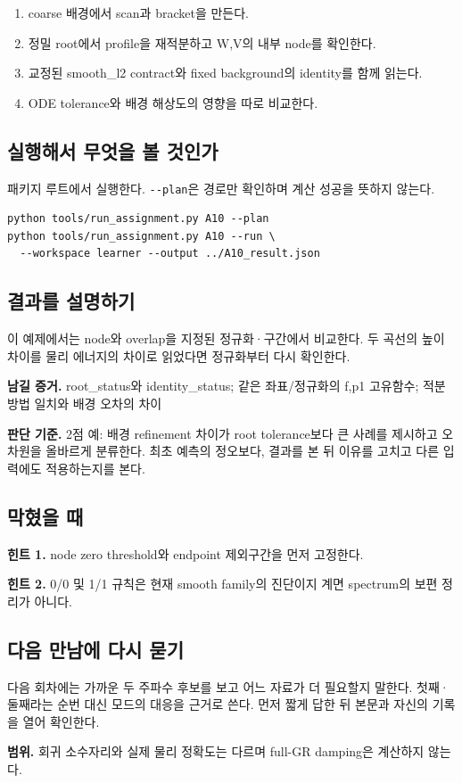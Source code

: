 \documentclass[
  10pt,
  a4paper,
]{article}
\providecommand{\tightlist}{%
  \setlength{\itemsep}{0pt}\setlength{\parskip}{0pt}}
\begin{document}
\begin{enumerate}
\def\labelenumi{\arabic{enumi}.}
\tightlist
\item
  coarse 배경에서 scan과 bracket을 만든다.
\item
  정밀 root에서 profile을 재적분하고 W,V의 내부 node를 확인한다.
\item
  교정된 smooth\_l2 contract와 fixed background의 identity를 함께
  읽는다.
\item
  ODE tolerance와 배경 해상도의 영향을 따로 비교한다.
\end{enumerate}

\newpage

\subsection{실행해서 무엇을 볼
것인가}\label{uxc2e4uxd589uxd574uxc11c-uxbb34uxc5c7uxc744-uxbcfc-uxac83uxc778uxac00}

패키지 루트에서 실행한다. \texttt{-\/-plan}은 경로만 확인하며 계산
성공을 뜻하지 않는다.

\begin{verbatim}
python tools/run_assignment.py A10 --plan
python tools/run_assignment.py A10 --run \
  --workspace learner --output ../A10_result.json
\end{verbatim}

\subsection{결과를
설명하기}\label{uxacb0uxacfcuxb97c-uxc124uxba85uxd558uxae30}

이 예제에서는 node와 overlap을 지정된 정규화·구간에서 비교한다. 두
곡선의 높이 차이를 물리 에너지의 차이로 읽었다면 정규화부터 다시
확인한다.

\textbf{남길 증거.} root\_status와 identity\_status; 같은 좌표/정규화의
f,p1 고유함수; 적분 방법 일치와 배경 오차의 차이

\textbf{판단 기준.} 2점 예: 배경 refinement 차이가 root tolerance보다 큰
사례를 제시하고 오차원을 올바르게 분류한다. 최초 예측의 정오보다, 결과를
본 뒤 이유를 고치고 다른 입력에도 적용하는지를 본다.

\subsection{막혔을 때}\label{uxb9c9uxd614uxc744-uxb54c}

\textbf{힌트 1.} node zero threshold와 endpoint 제외구간을 먼저
고정한다.

\textbf{힌트 2.} 0/0 및 1/1 규칙은 현재 smooth family의 진단이지 계면
spectrum의 보편 정리가 아니다.

\subsection{다음 만남에 다시
묻기}\label{uxb2e4uxc74c-uxb9ccuxb0a8uxc5d0-uxb2e4uxc2dc-uxbb3buxae30}

다음 회차에는 가까운 두 주파수 후보를 보고 어느 자료가 더 필요할지
말한다. 첫째·둘째라는 순번 대신 모드의 대응을 근거로 쓴다. 먼저 짧게
답한 뒤 본문과 자신의 기록을 열어 확인한다.

\textbf{범위.} 회귀 소수자리와 실제 물리 정확도는 다르며 full-GR
damping은 계산하지 않는다.
\end{document}
